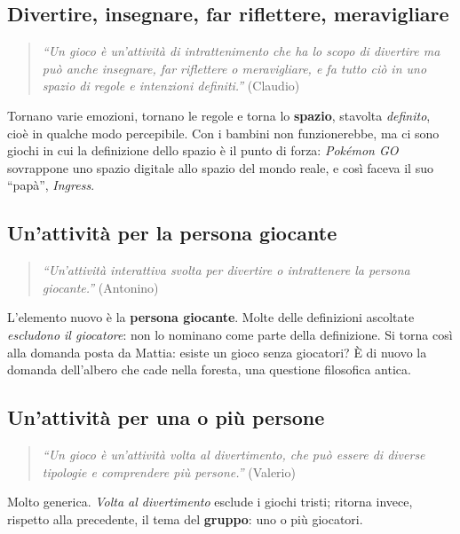 \subsection{Divertire, insegnare, far riflettere, meravigliare}

\begin{quote}
\emph{``Un gioco è un'attività di intrattenimento che ha lo scopo di divertire
ma può anche insegnare, far riflettere o meravigliare, e fa tutto ciò in uno
spazio di regole e intenzioni definiti.''} (Claudio)
\end{quote}

Tornano varie emozioni, tornano le regole e torna lo \textbf{spazio},
stavolta \emph{definito}, cioè in qualche modo percepibile. Con i bambini non
funzionerebbe, ma ci sono giochi in cui la definizione dello spazio è il
punto di forza: \emph{Pokémon GO} sovrappone uno spazio digitale allo spazio
del mondo reale, e così faceva il suo ``papà'', \emph{Ingress}.

\subsection{Un'attività per la persona giocante}

\begin{quote}
\emph{``Un'attività interattiva svolta per divertire o intrattenere la persona
giocante.''} (Antonino)
\end{quote}

L'elemento nuovo è la \textbf{persona giocante}. Molte delle definizioni
ascoltate \emph{escludono il giocatore}: non lo nominano come parte della
definizione. Si torna così alla domanda posta da Mattia: esiste un gioco senza
giocatori? È di nuovo la domanda dell'albero che cade nella foresta, una
questione filosofica antica.

\subsection{Un'attività per una o più persone}

\begin{quote}
\emph{``Un gioco è un'attività volta al divertimento, che può essere di diverse
tipologie e comprendere più persone.''} (Valerio)
\end{quote}

Molto generica. \emph{Volta al divertimento} esclude i giochi tristi; ritorna
invece, rispetto alla precedente, il tema del \textbf{gruppo}: uno o più
giocatori.

